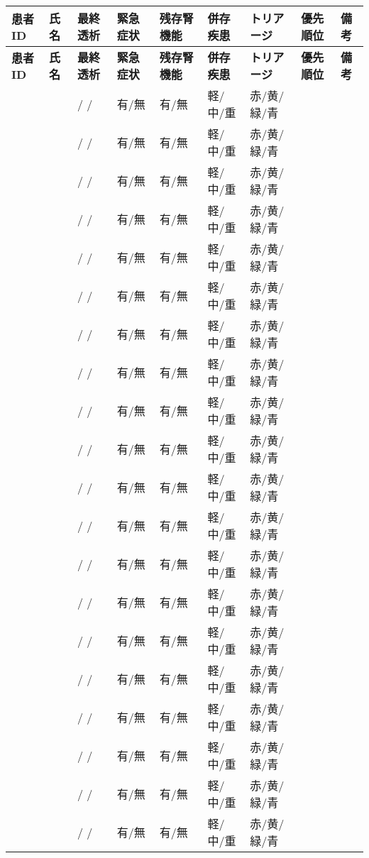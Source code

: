 \documentclass[a4paper,12pt]{jarticle}
\begin{document}
\begin{longtable}{|p{1.3cm}|p{1.8cm}|p{1.5cm}|p{1.3cm}|p{1.3cm}|p{1.3cm}|p{1.5cm}|p{1.3cm}|p{1.5cm}|}
\hline
\textbf{患者ID} & \textbf{氏名} & \textbf{最終透析} & \textbf{緊急症状} & \textbf{残存腎機能} & \textbf{併存疾患} & \textbf{トリアージ} & \textbf{優先順位} & \textbf{備考} \\
\hline
\endfirsthead

\hline
\textbf{患者ID} & \textbf{氏名} & \textbf{最終透析} & \textbf{緊急症状} & \textbf{残存腎機能} & \textbf{併存疾患} & \textbf{トリアージ} & \textbf{優先順位} & \textbf{備考} \\
\hline
\endhead

 &  & / / & 有/無 & 有/無 & 軽/中/重 & 赤/黄/緑/青 &  &  \\
\hline
 &  & / / & 有/無 & 有/無 & 軽/中/重 & 赤/黄/緑/青 &  &  \\
\hline
 &  & / / & 有/無 & 有/無 & 軽/中/重 & 赤/黄/緑/青 &  &  \\
\hline
 &  & / / & 有/無 & 有/無 & 軽/中/重 & 赤/黄/緑/青 &  &  \\
\hline
 &  & / / & 有/無 & 有/無 & 軽/中/重 & 赤/黄/緑/青 &  &  \\
\hline
 &  & / / & 有/無 & 有/無 & 軽/中/重 & 赤/黄/緑/青 &  &  \\
\hline
 &  & / / & 有/無 & 有/無 & 軽/中/重 & 赤/黄/緑/青 &  &  \\
\hline
 &  & / / & 有/無 & 有/無 & 軽/中/重 & 赤/黄/緑/青 &  &  \\
\hline
 &  & / / & 有/無 & 有/無 & 軽/中/重 & 赤/黄/緑/青 &  &  \\
\hline
 &  & / / & 有/無 & 有/無 & 軽/中/重 & 赤/黄/緑/青 &  &  \\
\hline
 &  & / / & 有/無 & 有/無 & 軽/中/重 & 赤/黄/緑/青 &  &  \\
\hline
 &  & / / & 有/無 & 有/無 & 軽/中/重 & 赤/黄/緑/青 &  &  \\
\hline
 &  & / / & 有/無 & 有/無 & 軽/中/重 & 赤/黄/緑/青 &  &  \\
\hline
 &  & / / & 有/無 & 有/無 & 軽/中/重 & 赤/黄/緑/青 &  &  \\
\hline
 &  & / / & 有/無 & 有/無 & 軽/中/重 & 赤/黄/緑/青 &  &  \\
\hline
 &  & / / & 有/無 & 有/無 & 軽/中/重 & 赤/黄/緑/青 &  &  \\
\hline
 &  & / / & 有/無 & 有/無 & 軽/中/重 & 赤/黄/緑/青 &  &  \\
\hline
 &  & / / & 有/無 & 有/無 & 軽/中/重 & 赤/黄/緑/青 &  &  \\
\hline
 &  & / / & 有/無 & 有/無 & 軽/中/重 & 赤/黄/緑/青 &  &  \\
\hline
 &  & / / & 有/無 & 有/無 & 軽/中/重 & 赤/黄/緑/青 &  &  \\
\hline
\end{longtable}
\end{document}
